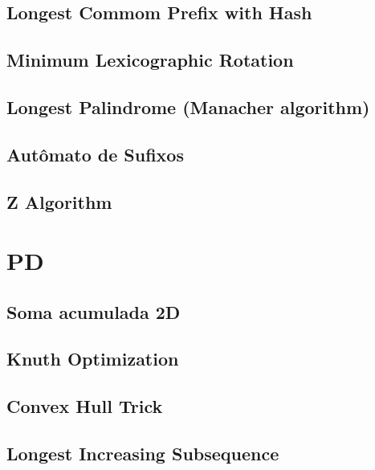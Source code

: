 \subsection{Longest Commom Prefix with Hash}
\raggedbottom
\hrulefill
\subsection{Minimum Lexicographic Rotation}
\raggedbottom
\hrulefill
\subsection{Longest Palindrome (Manacher algorithm)}
\raggedbottom
\hrulefill
\subsection{Autômato de Sufixos}
\raggedbottom
\hrulefill
\subsection{Z Algorithm}
\raggedbottom
\hrulefill

\section{PD}
\subsection{Soma acumulada 2D}
\raggedbottom
\hrulefill
\subsection{Knuth Optimization}
\raggedbottom
\hrulefill
\subsection{Convex Hull Trick}
\raggedbottom
\hrulefill
\subsection{Longest Increasing Subsequence}
\raggedbottom
\hrulefill
